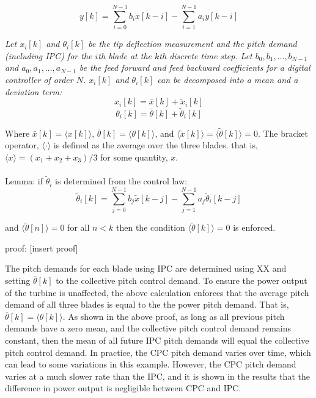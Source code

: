 $$
y[k]=\sum_{i=0}^{N-1}b_ix[k-i] - \sum_{i=1}^{N-1}a_iy[k-i]
$$

\textit{Let $x_i[k]$ and $\theta_i[k]$ be the tip deflection measurement and the pitch demand (including IPC) for the $i$th blade at the $k$th discrete time step.  Let $b_0, b_1, ..., b_{N-1}$ and $a_0, a_1, ..., a_{N-1}$ be the feed forward and feed backward coefficients for a digital controller of order $N$. $x_i[k]$ and $\theta_i[k]$ can be decomposed into a mean and a deviation term:
$$ x_i[k]= \bar{x}[k] + \tilde{x}_i[k]$$}
$$ \theta_i[k]= \bar{\theta}[k] + \tilde{\theta}_i[k]$$

Where $\bar{x}[k] = \langle x[k]\rangle$, $\bar{\theta}[k] = \langle\theta[k]\rangle$, and $\langle \tilde{x}[k]\rangle = \langle \tilde{\theta}[k]\rangle = 0$. The bracket operator, $\langle \cdot \rangle$ is defined as the average over the three blades. that is, $\langle x \rangle = (x_1 + x_2 + x_3)/3$ for some quantity, $x$. 
\\~\\
Lemma: if $\tilde{\theta}_i$ is determined from the control law:
$$\tilde{\theta}_i[k] = \sum_{j=0}^{N-1}b_j\tilde{x}[k-j] - \sum_{j=1}^{N-1}a_j\tilde{\theta}_i[k-j]$$
 
and $\langle \tilde{\theta}[n]\rangle = 0$ for all $n<k$ then the condition $\langle \tilde{\theta}[k]\rangle = 0$ is enforced.

proof:
[insert proof]


The pitch demands for each blade using IPC are determined using XX and setting $\bar{\theta}[k]$ to the collective pitch control demand. To ensure the power output of the turbine is unaffected, the above calculation enforces that the average pitch demand of all three blades is equal to the the power pitch demand. That is, $\bar{\theta}[k] = \langle\theta[k]\rangle$. As shown in the above proof, as long as all previous pitch demands have a zero mean, and the collective pitch control demand remains constant, then the mean of all future IPC pitch demands will equal the collective pitch control demand. In practice, the CPC pitch demand varies over time, which can lead to some variations in this example. However, the CPC pitch demand varies at a much slower rate than the IPC, and it is shown in the results that the difference in power output is negligible between CPC and IPC.

$$$$
